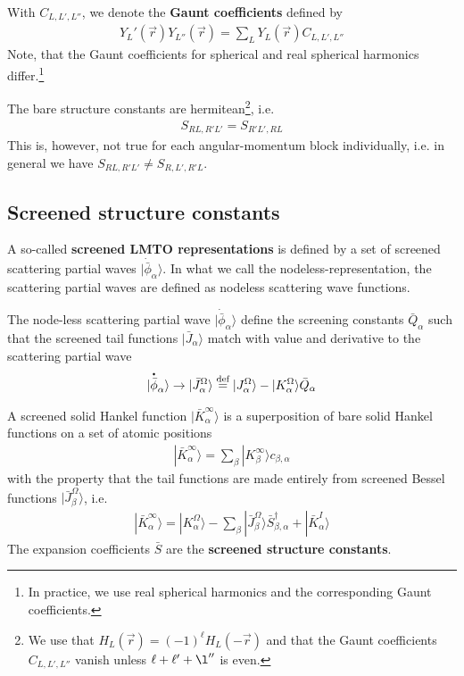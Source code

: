 \documentclass[11pt,a4paper]{report}
\begin{document}
With $C_{L,L',L''}$, we denote the \textbf{Gaunt
  coefficients} defined by
\begin{eqnarray}
Y_L'(\vec{r})Y_{L''}(\vec{r})=\sum_L Y_{L}(\vec{r})C_{L,L',L''}
\end{eqnarray}
Note, that the Gaunt coefficients for spherical and real spherical
harmonics differ.\footnote{In practice, we use real spherical
  harmonics and the corresponding Gaunt coefficients.}

The bare structure constants are hermitean\footnote{We use that
  $H_L(\vec{r})=(-1)^\ell H_L(-\vec{r})$ and that the Gaunt
  coefficients $C_{L,L',L''}$ vanish unless $\ell+\ell'+\l''$ is
  even.}, i.e.
\begin{eqnarray}
S_{RL,R'L'}=S_{R'L',RL}
\end{eqnarray}
This is, however, not true for each angular-momentum block individually,
i.e. in general we have $S_{RL,R'L'}\neq S_{R,L',R'L}$.

\subsection{Screened structure constants}
A so-called \textbf{screened LMTO representations} is defined by a set of screened scattering partial waves
$|\dot{\bar{\phi}}_\alpha\rangle$.  In what we call the
nodeless-representation, the scattering partial waves are defined as
nodeless scattering wave functions.


The node-less scattering partial wave
$|\dot{\bar{\phi}}_\alpha\rangle$ define the screening constants
$\bar{Q}_{\alpha}$ such that the screened tail functions
$|\bar{J}_\alpha\rangle$ match with value and derivative to the
scattering partial wave
\begin{eqnarray}
|\overset{\mbox{\large\bfseries .}}{\bar{\phi}}_\alpha\rangle \rightarrow 
|\bar{J}^{\Omega}_{\alpha}\rangle
\stackrel{\text{def}}{=}
|J^{\Omega}_{\alpha}\rangle
-|K^{\Omega}_{\alpha}\rangle \bar{Q}_{\alpha}
\end{eqnarray}

A screened solid Hankel function $|\bar{K}_{\alpha}^\infty\rangle$ is
a superposition of bare solid Hankel functions on a set of atomic
positions
\begin{eqnarray}
|\bar{K}^\infty_\alpha\rangle=\sum_\beta|K^\infty_\beta\rangle c_{\beta,\alpha}
\label{eq:kbarassuperposofkbare}
\end{eqnarray}
with the property that the tail functions are made entirely
from screened Bessel functions $|\bar{J}^\Omega_{\beta}\rangle$, i.e.
\begin{eqnarray}
|\bar{K}_{\alpha}^\infty\rangle=|K^\Omega_{\alpha}\rangle
-\sum_{\beta}|\bar{J}^\Omega_{\beta}\rangle \bar{S}^\dagger_{\beta,\alpha}
+|\bar{K}^I_{\alpha}\rangle
\label{eq:kbarwithsbar}
\end{eqnarray}
The expansion coefficients $\bar{S}$ are the \textbf{screened structure
constants}.
\end{document}
